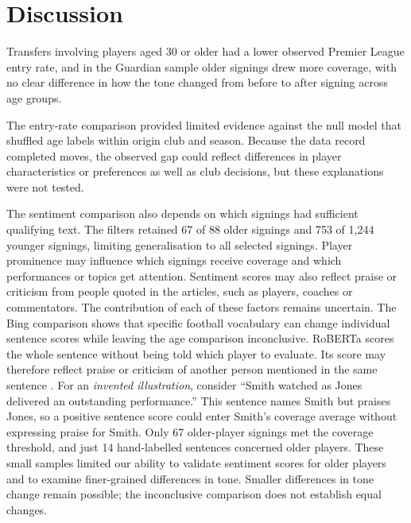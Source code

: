 \section*{Discussion}

Transfers involving players aged 30 or older had a lower observed Premier League entry rate, and in the Guardian sample older signings drew more coverage, with no clear difference in how the tone changed from before to after signing across age groups.

The entry-rate comparison provided limited evidence against the null model that shuffled age labels within origin club and season. Because the data record completed moves, the observed gap could reflect differences in player characteristics or preferences as well as club decisions, but these explanations were not tested. 

The sentiment comparison also depends on which signings had sufficient qualifying text. The filters retained 67 of 88 older signings and 753 of 1,244 younger signings, limiting generalisation to all selected signings. Player prominence may influence which signings receive coverage and which performances or topics get attention. Sentiment scores may also reflect praise or criticism from people quoted in the articles, such as players, coaches or commentators. The contribution of each of these factors remains uncertain. The Bing comparison shows that specific football vocabulary can change individual sentence scores while leaving the age comparison inconclusive. RoBERTa scores the whole sentence without being told which player to evaluate. Its score may therefore reflect praise or criticism of another person mentioned in the same sentence \cite{hamborg2021news}. For an \textit{invented illustration}, consider ``Smith watched as Jones delivered an outstanding performance.'' This sentence names Smith but praises Jones, so a positive sentence score could enter Smith's coverage average without expressing praise for Smith. Only 67 older-player signings met the coverage threshold, and just 14 hand-labelled sentences concerned older players. These small samples limited our ability to validate sentiment scores for older players and to examine finer-grained differences in tone. Smaller differences in tone change remain possible; the inconclusive comparison does not establish equal changes.

